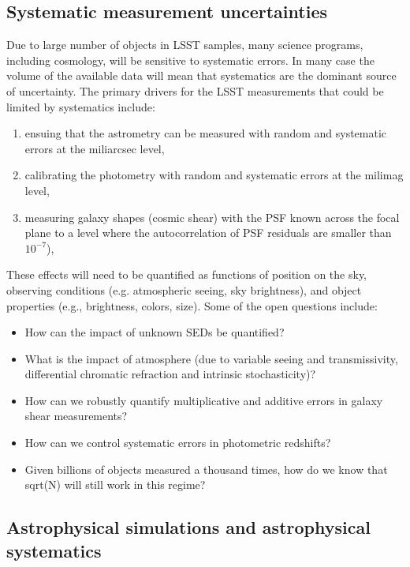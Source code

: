 \documentclass{iau}
\begin{document}
\subsection{Systematic measurement uncertainties}

Due to large number of objects in LSST samples, many science programs, including cosmology,
will be sensitive to systematic errors. In many case the volume of the
available data will mean that systematics are the dominant source of
uncertainty. The primary drivers for the LSST measurements that could
be limited by systematics include:
\begin{enumerate}
\item ensuing that the astrometry can be measured with random and systematic errors at the miliarcsec level,
\item calibrating the photometry with random and systematic errors at the milimag level,
\item measuring galaxy shapes (cosmic shear) with the PSF known across
  the focal plane to a level where the autocorrelation of PSF
  residuals are smaller than $10^{-7}$),
\end{enumerate}
These effects will need to be quantified as functions of position on the sky, observing 
conditions (e.g. atmospheric seeing, sky brightness), and object properties
(e.g., brightness, colors, size). Some of the open questions include:
\begin{itemize}
\item How can the impact of unknown SEDs be quantified? 
\item What is the impact of atmosphere (due to variable seeing and transmissivity, 
          differential chromatic refraction and intrinsic stochasticity)? 
\item How can we robustly quantify multiplicative and additive errors in galaxy shear measurements? 
\item How can we control systematic errors in photometric redshifts? 
\item Given billions of objects measured a thousand times, how do we know that sqrt(N) will still work
          in this regime? 
\end{itemize}



\subsection{Astrophysical simulations and astrophysical systematics}
\end{document}
